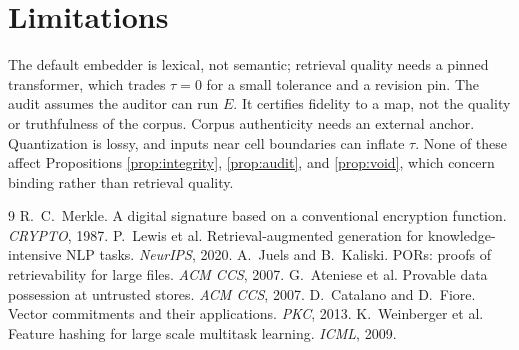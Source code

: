 \documentclass[10pt,twocolumn]{article}
\theoremstyle{remark}
\begin{document}
\section{Limitations}
The default embedder is lexical, not semantic; retrieval quality needs a pinned
transformer, which trades $\tau=0$ for a small tolerance and a revision pin. The
audit assumes the auditor can run $E$. It certifies fidelity to a map, not the
quality or truthfulness of the corpus. Corpus authenticity needs an external
anchor. Quantization is lossy, and inputs near cell boundaries can inflate
$\tau$. None of these affect Propositions \ref{prop:integrity}, \ref{prop:audit},
and \ref{prop:void}, which concern binding rather than retrieval quality.

\begin{thebibliography}{9}
\small
{} R.~C.~Merkle. A digital signature based on a conventional
encryption function. \emph{CRYPTO}, 1987.
 P.~Lewis et al. Retrieval-augmented generation for
knowledge-intensive NLP tasks. \emph{NeurIPS}, 2020.
 A.~Juels and B.~Kaliski. PORs: proofs of retrievability for large
files. \emph{ACM CCS}, 2007.
 G.~Ateniese et al. Provable data possession at untrusted stores.
\emph{ACM CCS}, 2007.
 D.~Catalano and D.~Fiore. Vector commitments and their
applications. \emph{PKC}, 2013.
 K.~Weinberger et al. Feature hashing for large scale multitask
learning. \emph{ICML}, 2009.
\end{thebibliography}
\end{document}
